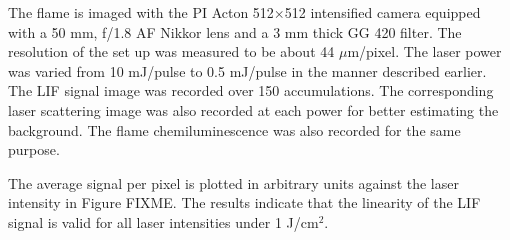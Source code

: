 The flame is imaged with the PI Acton 512\(\times\)512 intensified camera equipped with a 50 mm, f/1.8 AF Nikkor lens and a 3 mm thick GG 420 filter.
The resolution of the set up was measured to be about 44 \(\mu\)m/pixel.
The laser power was varied from 10 mJ/pulse to 0.5 mJ/pulse in the manner described earlier.
The LIF signal image was recorded over 150 accumulations.
The corresponding laser scattering image was also recorded at each power for better estimating the background.
The flame chemiluminescence was also recorded for the same purpose.

The average signal per pixel is plotted in arbitrary units against the laser intensity in Figure FIXME.
The results indicate that the linearity of the LIF signal is valid for all laser intensities under 1 J/cm\(^2\).

